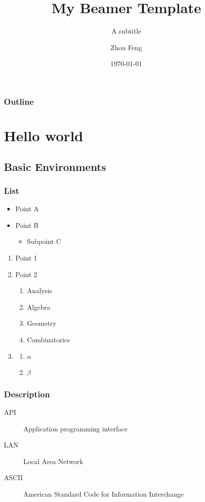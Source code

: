 \documentclass{beamer}
\title[Short Title]{My Beamer Template}
\subtitle{A subtitle}
\author[Z. Feng]{Zhou Feng}
\institute[]{The Chinese University of Hong Kong}
\date{\today}
\begin{document}
	
	

\begin{frame}[plain]
    \maketitle
\end{frame}

\begin{frame}\label{contents}
	\frametitle{Outline}
	\tableofcontents
\end{frame}



\section{Hello world}
\subsection{Basic Environments}
\begin{frame}
\frametitle{List}
	\begin{itemize}
		\item Point A
		\item Point B \cite{Falconer2003}
		\begin{itemize}
			\item Subpoint C
		\end{itemize}
	\end{itemize}
	
	\begin{enumerate}
		\item Point 1 \pause
		\item Point 2 
		\begin{enumerate}[I]
			\item Analysis
			\item Algebra
			\item Geometry
			\item Combinatorics
		\end{enumerate}
		\item 
		\begin{enumerate}[i]
			\item $ \alpha $
			\item $ \beta $
		\end{enumerate}
	\end{enumerate}

\end{frame}

\begin{frame}
	\frametitle{Description}
	\begin{description}
		\item[API] Application programming interface
		\item[LAN] Local Area Network
		\item[ASCII] American Standard Code for Information Interchange 
	\end{description}
\end{frame}
\end{document}
